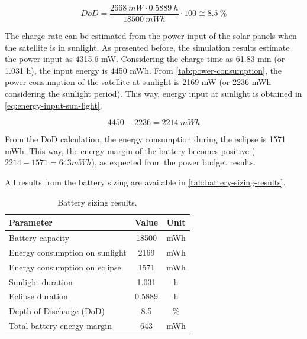 \begin{equation} \label{eq:dod-value}
    DoD = \frac{2668\ mW \cdot 0.5889\ h}{18500\ mWh} \cdot 100 \cong \mathbf{8.5\ \%}
\end{equation}

The charge rate can be estimated from the power input of the solar panels when the satellite is in sunlight. As presented before, the simulation results estimate the power input as 4315.6 mW. Considering the charge time as 61.83 min (or 1.031 h), the input energy is 4450 mWh. From \autoref{tab:power-consumption}, the power consumption of the satellite at sunlight is 2169 mW (or 2236 mWh considering the sunlight period). This way, energy input at sunlight is obtained in \autoref{eq:energy-input-sun-light}.

\begin{equation} \label{eq:energy-input-sun-light}
    4450 - 2236 = 2214\ mWh
\end{equation}

From the DoD calculation, the energy consumption during the eclipse is 1571 mWh. This way, the energy margin of the battery becomes positive ($2214 - 1571 = 643 mWh$), as expected from the power budget results.

All results from the battery sizing are available in \autoref{tab:battery-sizing-results}.

\begin{table}[!h]
    \centering
    \begin{tabular}{lcc}
        \toprule[1.5pt]
        \textbf{Parameter} & \textbf{Value}    & \textbf{Unit} \\
        \midrule
        Battery capacity                & 18500  & mWh \\
        Energy consumption on sunlight & 2169   & mWh \\
        Energy consumption on eclipse   & 1571   & mWh \\
        Sunlight duration              & 1.031  & h \\
        Eclipse duration                & 0.5889 & h \\
        Depth of Discharge (DoD)        & 8.5    & \% \\
        Total battery energy margin     & 643    & mWh \\
        \bottomrule[1.5pt]
    \end{tabular}
    \caption{Battery sizing results.}
    \label{tab:battery-sizing-results}
\end{table}


